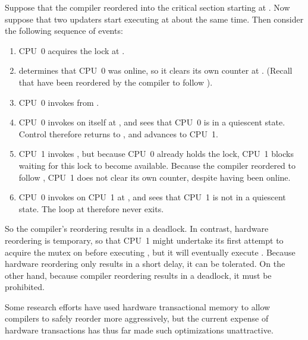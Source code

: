 {\begin{fcvref}
	Suppose that the compiler reordered  into
	the critical section starting at .
	Now suppose that two updaters start executing 
	at about the same time.
	Then consider the following sequence of events:
	\begin{enumerate}
	\item	CPU~0 acquires the lock at .
	\item	{} determines that CPU~0 was online, so it clears
		its own counter at .
		(Recall that  have been reordered by the
		compiler to follow ).
	\item	CPU~0 invokes  from
		.
	\item	CPU~0 invokes  on itself at
		, and  sees that CPU~0 is
		in a quiescent state.
		Control therefore returns to ,
		and  advances to CPU~1.
	\item	CPU~1 invokes , but because CPU~0
		already holds the lock, CPU~1 blocks waiting for this
		lock to become available.
		Because the compiler reordered  to follow
		, CPU~1 does not clear its own counter,
		despite having been online.
	\item	CPU~0 invokes  on CPU~1 at
		, and  sees that CPU~1 is
		not in a quiescent state.
		The  loop at  therefore never
		exits.
	\end{enumerate}

	So the compiler's reordering results in a deadlock.
	In contrast, hardware reordering is temporary, so that CPU~1
	might undertake its first attempt to acquire the mutex on
	 before executing , but it
	will eventually execute .
	Because hardware reordering only results in a short delay, it
	can be tolerated.
	On the other hand, because compiler reordering results in a
	deadlock, it must be prohibited.

	Some research efforts have used hardware transactional memory
	to allow compilers to safely reorder more aggressively, but
	the current expense of hardware transactions has thus far made
	such optimizations unattractive.
\end{fcvref}
}\QuickQuizEnd


